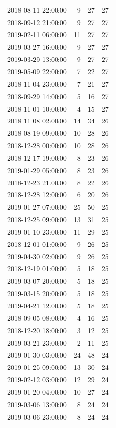 \begin{tabular}{lrrr}
2018-08-11 22:00:00 & 9 & 27 & 27 \\
2018-09-12 21:00:00 & 9 & 27 & 27 \\
2019-02-11 06:00:00 & 11 & 27 & 27 \\
2019-03-27 16:00:00 & 9 & 27 & 27 \\
2019-03-29 13:00:00 & 9 & 27 & 27 \\
2019-05-09 22:00:00 & 7 & 22 & 27 \\
2018-11-04 23:00:00 & 7 & 21 & 27 \\
2018-09-29 14:00:00 & 5 & 16 & 27 \\
2018-11-01 10:00:00 & 4 & 15 & 27 \\
2018-11-08 02:00:00 & 14 & 34 & 26 \\
2018-08-19 09:00:00 & 10 & 28 & 26 \\
2018-12-28 00:00:00 & 10 & 28 & 26 \\
2018-12-17 19:00:00 & 8 & 23 & 26 \\
2019-01-29 05:00:00 & 8 & 23 & 26 \\
2018-12-23 21:00:00 & 8 & 22 & 26 \\
2018-12-28 12:00:00 & 6 & 20 & 26 \\
2019-01-27 07:00:00 & 25 & 50 & 25 \\
2018-12-25 09:00:00 & 13 & 31 & 25 \\
2019-01-10 23:00:00 & 11 & 29 & 25 \\
2018-12-01 01:00:00 & 9 & 26 & 25 \\
2019-04-30 02:00:00 & 9 & 26 & 25 \\
2018-12-19 01:00:00 & 5 & 18 & 25 \\
2019-03-07 20:00:00 & 5 & 18 & 25 \\
2019-03-15 20:00:00 & 5 & 18 & 25 \\
2019-04-21 12:00:00 & 5 & 18 & 25 \\
2018-09-05 08:00:00 & 4 & 16 & 25 \\
2018-12-20 18:00:00 & 3 & 12 & 25 \\
2019-03-21 23:00:00 & 2 & 11 & 25 \\
2019-01-30 03:00:00 & 24 & 48 & 24 \\
2019-01-25 09:00:00 & 13 & 30 & 24 \\
2019-02-12 03:00:00 & 12 & 29 & 24 \\
2019-01-20 04:00:00 & 10 & 27 & 24 \\
2019-03-06 13:00:00 & 8 & 24 & 24 \\
2019-03-06 23:00:00 & 8 & 24 & 24 \\

\end{tabular}
